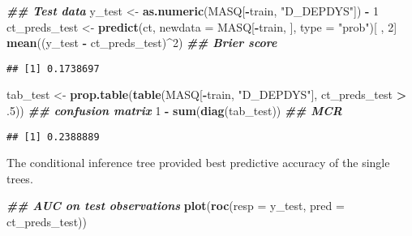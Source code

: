 \documentclass[
]{article}
\newenvironment{Shaded}{\begin{snugshade}}{\end{snugshade}}
\newcommand{\AttributeTok}[1]{\textcolor[rgb]{0.13,0.29,0.53}{#1}}
\newcommand{\DecValTok}[1]{\textcolor[rgb]{0.00,0.00,0.81}{#1}}
\newcommand{\DocumentationTok}[1]{\textcolor[rgb]{0.56,0.35,0.01}{\textbf{\textit{#1}}}}
\newcommand{\FunctionTok}[1]{\textcolor[rgb]{0.13,0.29,0.53}{\textbf{#1}}}
\newcommand{\NormalTok}[1]{#1}
\newcommand{\OtherTok}[1]{\textcolor[rgb]{0.56,0.35,0.01}{#1}}
\newcommand{\SpecialCharTok}[1]{\textcolor[rgb]{0.81,0.36,0.00}{\textbf{#1}}}
\newcommand{\StringTok}[1]{\textcolor[rgb]{0.31,0.60,0.02}{#1}}
\begin{document}
\begin{Shaded}
\begin{Highlighting}[]
\DocumentationTok{\#\# Test data}
\NormalTok{y\_test }\OtherTok{\textless{}{-}} \FunctionTok{as.numeric}\NormalTok{(MASQ[}\SpecialCharTok{{-}}\NormalTok{train, }\StringTok{"D\_DEPDYS"}\NormalTok{]) }\SpecialCharTok{{-}} \DecValTok{1}
\NormalTok{ct\_preds\_test }\OtherTok{\textless{}{-}} \FunctionTok{predict}\NormalTok{(ct, }\AttributeTok{newdata =}\NormalTok{ MASQ[}\SpecialCharTok{{-}}\NormalTok{train, ], }\AttributeTok{type =} \StringTok{"prob"}\NormalTok{)[ , }\DecValTok{2}\NormalTok{] }
\FunctionTok{mean}\NormalTok{((y\_test }\SpecialCharTok{{-}}\NormalTok{ ct\_preds\_test)}\SpecialCharTok{\^{}}\DecValTok{2}\NormalTok{) }\DocumentationTok{\#\# Brier score}
\end{Highlighting}
\end{Shaded}

\begin{verbatim}
## [1] 0.1738697
\end{verbatim}

\begin{Shaded}
\begin{Highlighting}[]
\NormalTok{tab\_test }\OtherTok{\textless{}{-}} \FunctionTok{prop.table}\NormalTok{(}\FunctionTok{table}\NormalTok{(MASQ[}\SpecialCharTok{{-}}\NormalTok{train, }\StringTok{"D\_DEPDYS"}\NormalTok{], ct\_preds\_test }\SpecialCharTok{\textgreater{}}\NormalTok{ .}\DecValTok{5}\NormalTok{)) }\DocumentationTok{\#\# confusion matrix}
\DecValTok{1} \SpecialCharTok{{-}} \FunctionTok{sum}\NormalTok{(}\FunctionTok{diag}\NormalTok{(tab\_test)) }\DocumentationTok{\#\# MCR}
\end{Highlighting}
\end{Shaded}

\begin{verbatim}
## [1] 0.2388889
\end{verbatim}

The conditional inference tree provided best predictive accuracy of the
single trees.

\begin{Shaded}
\begin{Highlighting}[]
\DocumentationTok{\#\# AUC on test observations}
\FunctionTok{plot}\NormalTok{(}\FunctionTok{roc}\NormalTok{(}\AttributeTok{resp =}\NormalTok{ y\_test, }\AttributeTok{pred =}\NormalTok{ ct\_preds\_test))}
\end{Highlighting}
\end{Shaded}
\end{document}
